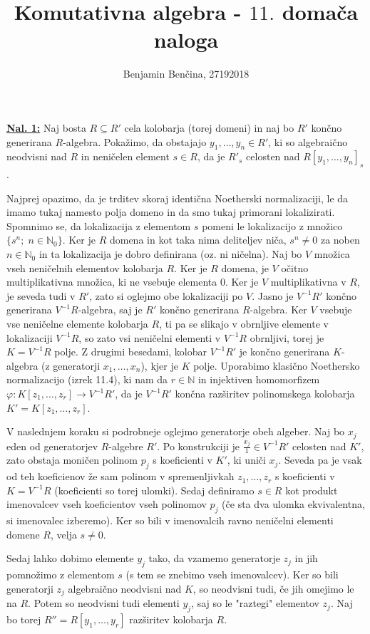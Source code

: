 \documentclass[a4paper, 12pt]{article}
\title{Komutativna algebra - $11.$ domača naloga}
\author{Benjamin Benčina, 27192018}
\newcommand{\N}{\mathbb{N}}
\begin{document}
\maketitle

\underline{\textbf{Nal. 1:}}
Naj bosta $R \subseteq R'$ cela kolobarja (torej domeni) in naj bo $R'$ končno generirana $R$-algebra. Pokažimo, da obstajajo $y_1, \dots, y_n \in R'$, ki so algebraično neodvisni nad $R$ in neničelen element $s \in R$, da je $R'_s$ celosten nad $R[y_1,\dots,y_n]_s$.

Najprej opazimo, da je trditev skoraj identična Noetherski normalizaciji, le da imamo tukaj namesto polja domeno in da smo tukaj primorani lokalizirati. Spomnimo se, da lokalizacija z elementom $s$ pomeni le lokalizacijo z množico $\lbrace s^n ; \; n \in \N_0\rbrace$. Ker je $R$ domena in kot taka nima deliteljev niča, $s^n \neq 0$ za noben $n \in \N_0$ in ta lokalizacija je dobro definirana (oz. ni ničelna).
Naj bo $V$ množica vseh neničelnih elementov kolobarja $R$. Ker je $R$ domena, je $V$ očitno multiplikativna množica, ki ne vsebuje elementa $0$. Ker je $V$ multiplikativna v $R$, je seveda tudi v $R'$, zato si oglejmo obe lokalizaciji po $V$. Jasno je $V^{-1}R'$ končno generirana $V^{-1}R$-algebra, saj je $R'$ končno generirana $R$-algebra. Ker $V$ vsebuje vse neničelne elemente kolobarja $R$, ti pa se slikajo v obrnljive elemente v lokalizaciji $V^{-1}R$, so zato vsi neničelni elementi v $V^{-1}R$ obrnljivi, torej je $K = V^{-1}R$ polje. Z drugimi besedami, kolobar $V^{-1}R'$ je končno generirana $K$-algebra (z generatorji $x_1,\dots, x_n$), kjer je $K$ polje. Uporabimo klasično Noethersko normalizacijo (izrek 11.4), ki nam da $r \in \N$ in injektiven homomorfizem $\varphi\colon K[z_1, \dots, z_r] \to V^{-1}R'$, da je $V^{-1}R'$ končna razširitev polinomskega kolobarja $K' = K[z_1, \dots, z_r]$.

V naslednjem koraku si podrobneje oglejmo generatorje obeh algeber. Naj bo $x_j$ eden od generatorjev $R$-algebre $R'$. Po konstrukciji je $\frac{x_j}{1} \in V^{-1}R'$ celosten nad $K'$, zato obstaja moničen polinom $p_j$ s koeficienti v $K'$, ki uniči $x_j$. Seveda pa je vsak od teh koeficienov že sam polinom v spremenljivkah $z_1,\dots, z_r$ s koeficienti v $K = V^{-1}R$ (koeficienti so torej ulomki). Sedaj definiramo $s \in R$ kot produkt imenovalcev vseh koeficientov vseh polinomov $p_j$ (če sta dva ulomka ekvivalentna, si imenovalec izberemo). Ker so bili v imenovalcih ravno neničelni elementi domene $R$, velja $s \neq 0$.

Sedaj lahko dobimo elemente $y_j$ tako, da vzamemo generatorje $z_j$ in jih pomnožimo z elementom $s$ (s tem se znebimo vseh imenovalcev). Ker so bili generatorji $z_j$ algebraično neodvisni nad $K$, so neodvisni tudi, če jih omejimo le na $R$. Potem so neodvisni tudi elementi $y_j$, saj so le "raztegi" elementov $z_j$. Naj bo torej $R'' = R[y_1,\dots,y_r]$ razširitev kolobarja $R$.
\end{document}
